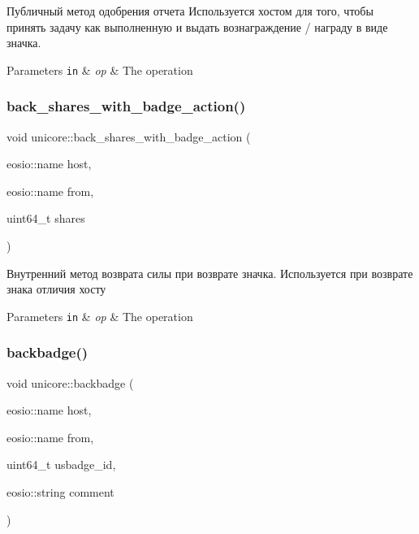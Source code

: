 Публичный метод одобрения отчета Используется хостом для того, чтобы принять задачу как выполненную и выдать вознаграждение / награду в виде значка. 


\begin{DoxyParams}[1]{Parameters}
\mbox{\tt in}  & {\em op} & The operation \\
\hline
\end{DoxyParams}
\mbox{\label{classunicore_aa78e3ba614a74bf7edd3fdfa0b048b23}} 
\subsubsection{\texorpdfstring{back\+\_\+shares\+\_\+with\+\_\+badge\+\_\+action()}{back\_shares\_with\_badge\_action()}}
{\footnotesize\ttfamily void unicore\+::back\+\_\+shares\+\_\+with\+\_\+badge\+\_\+action (\begin{DoxyParamCaption}\item[{eosio\+::name}]{host,  }\item[{eosio\+::name}]{from,  }\item[{uint64\+\_\+t}]{shares }\end{DoxyParamCaption})\hspace{0.3cm}{\ttfamily [static]}}



Внутренний метод возврата силы при возврате значка. Используется при возврате знака отличия хосту 


\begin{DoxyParams}[1]{Parameters}
\mbox{\tt in}  & {\em op} & The operation \\
\hline
\end{DoxyParams}
\mbox{\label{classunicore_a6e7db779eb5836300fabe105012388c2}} 
\subsubsection{\texorpdfstring{backbadge()}{backbadge()}}
{\footnotesize\ttfamily void unicore\+::backbadge (\begin{DoxyParamCaption}\item[{eosio\+::name}]{host,  }\item[{eosio\+::name}]{from,  }\item[{uint64\+\_\+t}]{usbadge\+\_\+id,  }\item[{eosio\+::string}]{comment }\end{DoxyParamCaption})}



